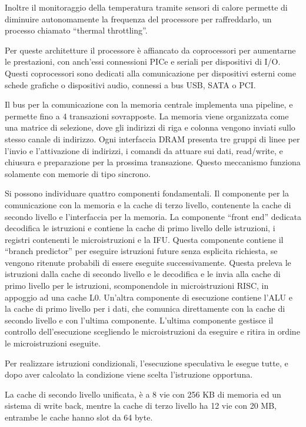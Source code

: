 \documentclass{article}
\numberwithin{equation}{subsection}
\begin{document}
Inoltre il monitoraggio della temperatura tramite sensori di calore permette di diminuire autonomamente la frequenza del processore per raffreddarlo, un processo chiamato 
``thermal throttling''. 


Per queste architetture il processore è affiancato da coprocessori per aumentarne le prestazioni, con anch'essi connessioni PICe e seriali per dispositivi di I/O. Questi coprocessori 
sono dedicati alla comunicazione per dispositivi esterni come schede grafiche o dispositivi audio, connessi a bus USB, SATA o PCI. 


Il bus per la comunicazione con la memoria centrale implementa una pipeline, e permette fino a 4 transazioni sovrapposte. 
La memoria viene organizzata come una matrice di selezione, dove gli indirizzi di riga e colonna vengono inviati sullo stesso canale di indirizzo. 
Ogni interfaccia DRAM presenta tre gruppi di linee per l'invio e l'attivazione di indirizzi, i comandi da attuare sui dati, read/write, e chiusura e preparazione per la 
prossima transazione. Questo meccanismo funziona solamente con memorie di tipo sincrono. 

Si possono individuare quattro componenti fondamentali. 
Il componente per la comunicazione con la memoria e la cache di terzo livello, contenente la cache di secondo livello e l'interfaccia per la memoria. 
La componente ``front end'' dedicata decodifica le istruzioni e contiene la cache di primo livello delle istruzioni, i registri contenenti le microistruzioni e la IFU. Questa componente contiene il ``branch predictor'' per eseguire istruzioni 
future senza esplicita richiesta, se vengono ritenute probabili di essere eseguite successivamente. 
Questa preleva le istruzioni dalla cache di secondo livello e le decodifica e le invia alla cache di primo livello per le istruzioni, scomponendole in 
microistruzioni RISC, in appoggio ad una cache L0. 
Un'altra componente di esecuzione contiene l'ALU e la cache di primo livello per i dati, che comunica direttamente con la cache di secondo livello e con l'ultima componente. 
L'ultima componente gestisce il controllo dell'esecuzione scegliendo le microistruzioni da eseguire e ritira in ordine le microistruzioni eseguite. 

Per realizzare istruzioni condizionali, l'esecuzione speculativa le esegue tutte, e dopo aver calcolato la condizione viene scelta l'istruzione opportuna. 

La cache di secondo livello unificata, è a 8 vie con 256 KB di memoria ed un sistema di write back, mentre la cache di terzo livello ha 12 vie con 20 MB, entrambe le cache hanno 
slot da 64 byte. 
\end{document}

